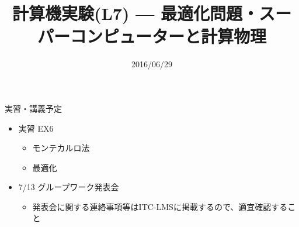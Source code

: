 \documentclass[dvipdfmx]{beamer}
\title{計算機実験(L7) --- 最適化問題・スーパーコンピューターと計算物理}
\date{2016/06/29}
\begin{document}
\begin{frame}
  \titlepage
  \tableofcontents
\end{frame}








\section{}

\begin{frame}[t,fragile]{実習・講義予定}
  \begin{itemize}
    \setlength{\itemsep}{1em}
  \item 実習 EX6
    \begin{itemize}
    \item モンテカルロ法
    \item 最適化
    \end{itemize}
  \item 7/13 グループワーク発表会
    \begin{itemize}
    \item 発表会に関する連絡事項等はITC-LMSに掲載するので、適宜確認すること
    \end{itemize}
  \end{itemize}
\end{frame}
\end{document}
